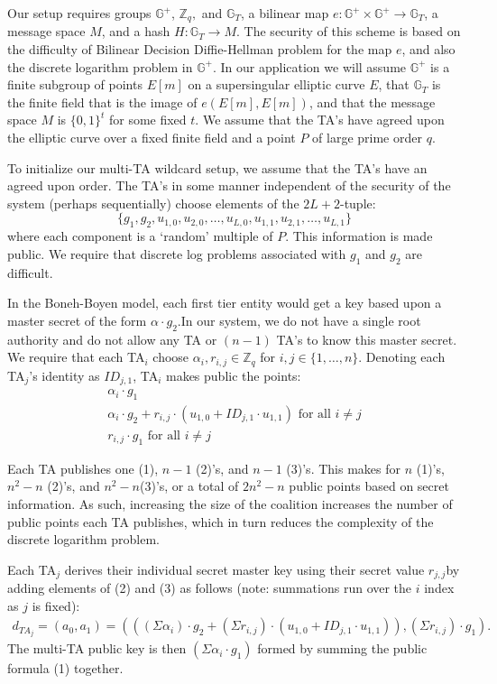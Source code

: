 \documentclass[10pt]{article}
\begin{document}
Our setup requires groups $\mathbb{G}^+$, $\mathbb{Z}_q,$ and $\mathbb{G}_T$, a bilinear map $e: \mathbb{G}^+\times \mathbb{G}^+ \rightarrow \mathbb{G}_T$, a message space $M$, and a hash $H: \mathbb{G}_T \rightarrow M$.  The security of this scheme is based on the difficulty of Bilinear Decision Diffie-Hellman problem for the map $e$, and also the discrete logarithm problem in $\mathbb{G}^+$. In our application we will assume $\mathbb{G}^+$ is a finite subgroup of points $E[m]$ on a supersingular elliptic curve $E$, that $\mathbb{G}_T$ is the finite field that is the image of $e(E[m], E[m])$, and that the message space $M$ is $\{0, 1\}^t$ for some fixed $t$.  We assume that the TA's have agreed upon the elliptic curve over a fixed finite field and a point $P$ of large prime order $q$.

To initialize our multi-TA wildcard setup, we assume that the TA's have an agreed upon order. The TA's in some manner independent of the security of the system (perhaps sequentially) choose elements of the $2L + 2$-tuple:
$$\{g_1, g_2, u_{1,0}, u_{2,0}, \dots, u_{L, 0},u_{1,1}, u_{2,1}, \dots, u_{L,1}\}$$
where each component is a `random' multiple of $P$. This information is made public. We require that discrete log problems associated with $g_1$ and $g_2$ are difficult.

In the Boneh-Boyen model, each first tier entity would get a key based upon a master secret of the form $\alpha\cdot g_2$.In our system, we do not have a single root authority and do not allow any TA or $(n-1)$ TA's to know this master secret. We require that each TA$_i$ choose $\alpha_i, r_{i,j} \in \mathbb{Z}_q$ for $i,j \in \{1, \dots, n\}$. Denoting each TA$_j$'s identity as $ID_{j,1}$, TA$_i$ makes public the points:
\begin{align}
\alpha_i \cdot g_1\\
\alpha_i \cdot g_2 + r_{i,j} \cdot (u_{1,0} + ID_{j,1} \cdot u_{1,1})\text{ for all } i \not= j\\
r_{i,j}\cdot g_1 \text{ for all } i \not= j
\end{align}

Each TA publishes one (1), $n-1$ (2)'s, and $n-1$ (3)'s.  This makes for $n$ (1)'s, $n^2 - n$ (2)'s, and $n^2 - n$(3)'s, or a total of $2n^2 - n$ public points based on secret information.  As such, increasing the size of the coalition increases the number of public points each TA publishes, which in turn reduces the complexity of the discrete logarithm problem.

Each TA$_j$ derives their individual secret master key using their secret value $r_{j,j}$by adding elements of (2) and (3) as follows (note: summations run over the $i$ index as $j$ is fixed):
\begin{align*}
d_{TA_j} = (a_0, a_1) = (((\Sigma \alpha_i)\cdot g_2 + (\Sigma r_{i,j}) \cdot (u_{1,0} + ID_{j,1} \cdot u_{1,1})),(\Sigma r_{i,j}) \cdot g_1).
\end{align*}
The multi-TA public key is then $(\Sigma \alpha_i \cdot g_1)$ formed by summing the public formula (1) together.
\end{document}
